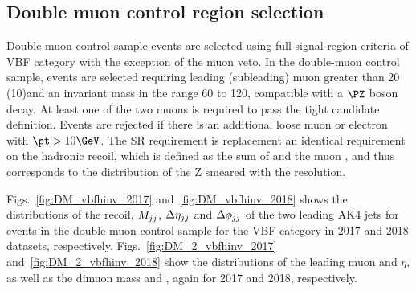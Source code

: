 \newpage

\subsection{Double muon control region selection}
\label{sec:selection_cr_2m}
Double-muon control sample events are selected using full signal region criteria of VBF category with the exception of the muon veto. 
In the double-muon control sample, events are selected requiring leading (subleading) muon \pt greater than 20 (10)\GeV and 
an invariant mass in the range 60 to 120\GeV, compatible with a $\PZ$ boson decay. At least one of the two muons is required to 
pass the tight candidate definition. Events are rejected if there is an additional loose muon or electron with $\pt > 10\GeV$. 
The SR \ptmiss requirement is replacement an identical requirement on the hadronic recoil, which is defined as the sum of \ptvecmiss 
and the muon \vpt, and thus corresponds to the distribution of the Z \pt smeared with the \ptmiss resolution.

Figs.~\ref{fig:DM_vbfhinv_2017} and~\ref{fig:DM_vbfhinv_2018} shows the distributions of the recoil, $M_{jj}$, $\Delta \eta_{jj}$ and  
$\Delta \phi_{jj}$ of the two leading AK4 jets for events in the double-muon control sample for the VBF category 
in 2017 and 2018 datasets, respectively. Figs.~\ref{fig:DM_2_vbfhinv_2017} and~\ref{fig:DM_2_vbfhinv_2018} show the distributions 
of the leading muon \pt and $\eta$, as well as the dimuon mass and \pt, again for 2017 and 2018, respectively.


